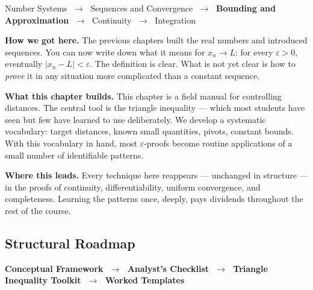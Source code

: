 
\begin{tcolorbox}[
  colback=gray!6,
  colframe=gray!40,
  arc=2pt,
  left=8pt, right=8pt, top=6pt, bottom=6pt,
  title={\small\textbf{Where You Are in the Journey}},
  fonttitle=\small\bfseries
]
\begin{center}
\small
Number Systems
$\;\to\;$ Sequences and Convergence
$\;\to\;$ \textbf{Bounding and Approximation}
$\;\to\;$ Continuity
$\;\to\;$ Integration
\end{center}

\medskip
\noindent\textbf{How we got here.}
The previous chapters built the real numbers and introduced sequences.
You can now write down what it means for $x_n \to L$: for every
$\varepsilon > 0$, eventually $|x_n - L| < \varepsilon$.
The definition is clear. What is not yet clear is how to \emph{prove}
it in any situation more complicated than a constant sequence.

\medskip
\noindent\textbf{What this chapter builds.}
This chapter is a field manual for controlling distances.
The central tool is the triangle inequality — which most students
have seen but few have learned to use deliberately.
We develop a systematic vocabulary: target distances, known small
quantities, pivots, constant bounds. With this vocabulary in hand,
most $\varepsilon$-proofs become routine applications of a small
number of identifiable patterns.

\medskip
\noindent\textbf{Where this leads.}
Every technique here reappears — unchanged in structure — in the proofs of
continuity, differentiability, uniform convergence, and completeness.
Learning the patterns once, deeply, pays dividends throughout the rest
of the course.
\end{tcolorbox}
\vspace{1em}

\subsection*{Structural Roadmap}

\begin{center}
  \textbf{Conceptual Framework
  $\;\longrightarrow\;$ Analyst's Checklist
  $\;\longrightarrow\;$ Triangle Inequality Toolkit
  $\;\longrightarrow\;$ Worked Templates}
\end{center}

